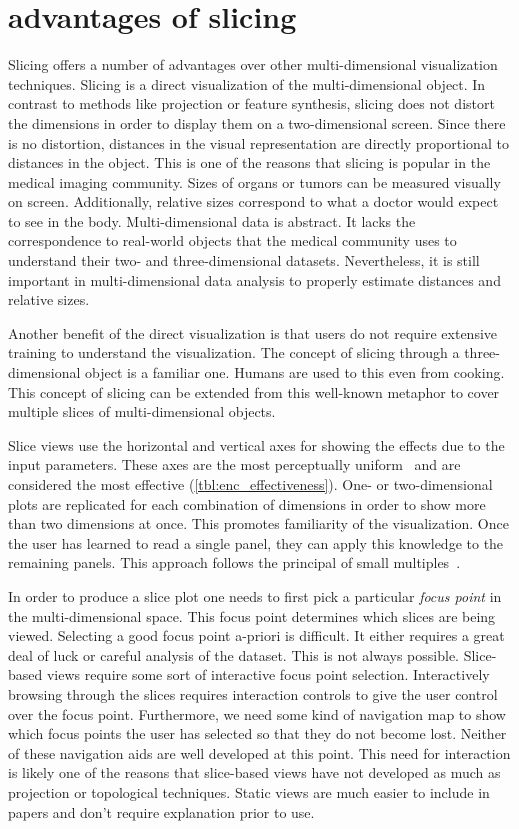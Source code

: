 \section{advantages of slicing}
\label{sec:slicing-advantages}

Slicing offers a number of advantages over other multi-dimensional
visualization techniques. Slicing is a direct visualization of the
multi-dimensional object. In contrast to methods like projection or feature
synthesis, slicing does not distort the dimensions in order to display them on
a two-dimensional screen. Since there is no distortion, distances in the visual
representation are directly proportional to distances in the object. This is
one of the reasons that slicing is popular in the medical imaging community.
Sizes of organs or tumors can be measured visually on screen. Additionally,
relative sizes correspond to what a doctor would expect to see in the body.
Multi-dimensional data is abstract. It lacks the correspondence to real-world
objects that the medical community uses to understand their two- and
three-dimensional datasets. Nevertheless, it is still important in
multi-dimensional data analysis to properly estimate distances and relative
sizes. 

Another benefit of the direct visualization is that users do not require
extensive training to understand the visualization. The concept of slicing
through a three-dimensional object is a familiar one. Humans are used to this
even from cooking. This concept of slicing can be extended from this 
well-known metaphor to cover multiple slices of multi-dimensional objects.

Slice views use the horizontal and vertical axes for showing the effects due to
the input parameters. These axes are the most perceptually
uniform~\cite{Stevens:1957} and are considered the most effective
(\autoref{tbl:enc_effectiveness}). One- or two-dimensional
plots are replicated for each combination of dimensions in order to show more
than two dimensions at once. This promotes familiarity of the visualization.
Once the user has learned to read a single panel, they can apply this knowledge
to the remaining panels. This approach follows the principal of small
multiples~\cite{Archambault:2011}.

In order to produce a slice plot one needs to first pick a particular
\emph{focus point} in the multi-dimensional space. This focus point determines
which slices are being viewed. Selecting a good focus point a-priori is
difficult. It either requires a great deal of luck or careful analysis of the
dataset. This is not always possible. Slice-based views require some sort of
interactive focus point selection. Interactively browsing through the slices
requires interaction controls to give the user control over the focus point.
Furthermore, we need some kind of navigation map to show which focus points the
user has selected so that they do not become lost. Neither of these navigation
aids are well developed at this point. This need for interaction is likely one
of the reasons that slice-based views have not developed as much as projection
or topological techniques. Static views are much easier to include in papers
and don't require explanation prior to use.


